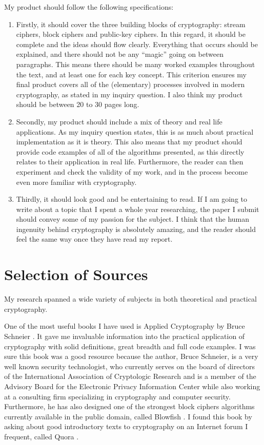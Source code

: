 \documentclass[12pt, a4paper, draft]{report}
\begin{document}
My product should follow the following specifications:
\begin{enumerate}
\item Firstly, it should cover the three building blocks of cryptography:
stream ciphers, block ciphers and public-key ciphers. In this regard, it
should be complete and the ideas should flow clearly. Everything that
occurs should be explained, and there should not be any ``magic'' going
on between paragraphs. This means there should be many worked examples
throughout the text, and at least one for each key concept. This criterion
ensures my final product covers all of the (elementary) processes involved in
modern cryptography, as stated in my inquiry question. I also think my product
should be between 20 to 30 pages long.

\item Secondly, my product should include a mix of theory and real life
applications. As my inquiry question states, this is as much about
practical implementation as it is theory. This also means that my
product should provide code examples of all of the algorithms presented,
as this directly relates to their application in real life. Furthermore,
the reader can then experiment and check the validity of my work, and
in the process become even more familiar with cryptography.

\item Thirdly, it should look good and be entertaining to read. If I am
going to write about a topic that I spent a whole year researching, the paper
I submit should convey some of my passion for the subject. I think that the
human ingenuity behind cryptography is absolutely amazing, and the reader
should feel the same way once they have read my report.
\end{enumerate}

\section*{Selection of Sources}

My research spanned a wide variety of subjects in both theoretical and
practical cryptography.

One of the most useful books I have used is Applied Cryptography
by Bruce Schneier \cite{schneier}. It gave me invaluable information into the
practical application of cryptography with solid definitions,
great breadth and full code examples. I was sure this book was a good
resource because the author, Bruce Schneier, is a very well known
security technologist, who currently serves on the board of directors
of the International Association of Cryptologic Research and is a member
of the Advisory Board for the Electronic Privacy Information Center while
also working at a consulting firm specializing in cryptography and computer
security. Furthermore, he has also designed one of the strongest block
ciphers algorithms currently available in the public domain, called Blowfish
\cite{blowfish}. I found this book by asking about good introductory texts to
cryptography on an Internet forum I frequent, called Quora \cite{quora}.
\end{document}
